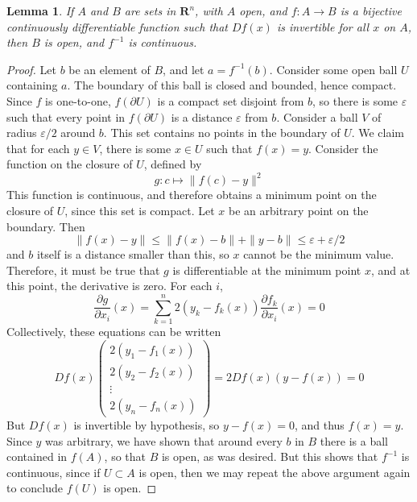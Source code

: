 \documentclass[12pt]{amsbook}
\theoremstyle{plain}
\newtheorem{lemma}[theorem]{Lemma}
\theoremstyle{definition}
\begin{document}
\begin{lemma}
    If $A$ and $B$ are sets in $\mathbf{R}^n$, with $A$ open, and $f:A \to B$ is a bijective continuously differentiable function such that $Df(x)$ is invertible for all $x$ on $A$, then $B$ is open, and $f^{-1}$ is continuous.
\end{lemma}
\begin{proof}
    Let $b$ be an element of $B$, and let $a = f^{-1}(b)$. Consider some open ball $U$ containing $a$. The boundary of this ball is closed and bounded, hence compact. Since $f$ is one-to-one, $f(\partial U)$ is a compact set disjoint from $b$, so there is some $\varepsilon$ such that every point in $f(\partial U)$ is a distance $\varepsilon$ from $b$. Consider a ball $V$ of radius $\varepsilon/2$ around $b$. This set contains no points in the boundary of $U$. We claim that for each $y \in V$, there is some $x \in U$ such that $f(x) = y$. Consider the function on the closure of $U$, defined by
    \[ g: c \mapsto \|f(c) - y \|^2 \]
    This function is continuous, and therefore obtains a minimum point on the closure of $U$, since this set is compact. Let $x$ be an arbitrary point on the boundary. Then
    \[ \| f(x) - y \| \leq \| f(x) - b \| + \| y - b \| \leq \varepsilon + \varepsilon/2 \]
    and $b$ itself is a distance smaller than this, so $x$ cannot be the minimum value. Therefore, it must be true that $g$ is differentiable at the minimum point $x$, and at this point, the derivative is zero. For each $i$,
    \[ \frac{\partial g}{\partial x_i}(x) = \sum_{k = 1}^n 2(y_k - f_k(x)) \frac{\partial f_k}{\partial x_i}(x) = 0 \]
    Collectively, these equations can be written
    \[ Df(x) \begin{pmatrix} 2(y_1 - f_1(x)) \\ 2(y_2 - f_2(x)) \\ \vdots \\ 2(y_n - f_n(x)) \end{pmatrix} = 2 Df(x) (y - f(x)) = 0 \]
    But $Df(x)$ is invertible by hypothesis, so $y - f(x) = 0$, and thus $f(x) = y$. Since $y$ was arbitrary, we have shown that around every $b$ in $B$ there is a ball contained in $f(A)$, so that $B$ is open, as was desired. But this shows that $f^{-1}$ is continuous, since if $U \subset A$ is open, then we may repeat the above argument again to conclude $f(U)$ is open.
\end{proof}
\end{document}
